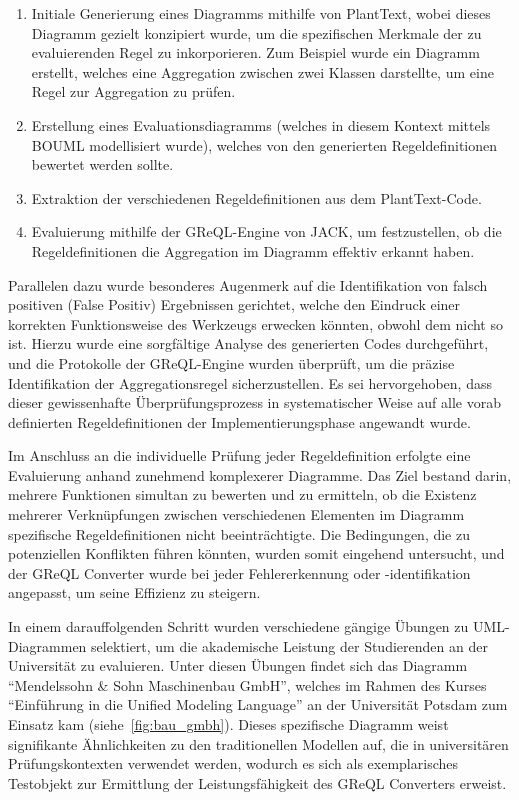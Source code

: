 \begin{enumerate}
    \item Initiale Generierung eines Diagramms mithilfe von PlantText, wobei dieses Diagramm gezielt konzipiert wurde,
um die spezifischen Merkmale der zu evaluierenden Regel zu inkorporieren. Zum Beispiel wurde ein Diagramm erstellt,
welches eine Aggregation zwischen zwei Klassen darstellte, um eine Regel zur Aggregation zu prüfen.
    \item Erstellung eines Evaluationsdiagramms (welches in diesem Kontext mittels BOUML modellisiert wurde), welches von
den generierten Regeldefinitionen bewertet werden sollte.
    \item Extraktion der verschiedenen Regeldefinitionen aus dem PlantText-Code.
    \item Evaluierung mithilfe der GReQL-Engine von JACK, um festzustellen, ob die Regeldefinitionen die Aggregation
im Diagramm effektiv erkannt haben.
\end{enumerate}

Parallelen dazu wurde besonderes Augenmerk auf die Identifikation von falsch positiven (False Positiv) Ergebnissen
gerichtet, welche den Eindruck einer korrekten Funktionsweise des Werkzeugs erwecken könnten, obwohl dem nicht so ist.
Hierzu wurde eine sorgfältige Analyse des generierten Codes durchgeführt, und die Protokolle der GReQL-Engine wurden
überprüft, um die präzise Identifikation der Aggregationsregel sicherzustellen. Es sei hervorgehoben, dass dieser
gewissenhafte Überprüfungsprozess in systematischer Weise auf alle vorab definierten Regeldefinitionen der
Implementierungsphase angewandt wurde.

Im Anschluss an die individuelle Prüfung jeder Regeldefinition erfolgte eine Evaluierung anhand zunehmend komplexerer
Diagramme. Das Ziel bestand darin, mehrere Funktionen simultan zu bewerten und zu ermitteln, ob die Existenz mehrerer
Verknüpfungen zwischen verschiedenen Elementen im Diagramm spezifische Regeldefinitionen nicht beeinträchtigte. Die
Bedingungen, die zu potenziellen Konflikten führen könnten, wurden somit eingehend untersucht, und der GReQL Converter
wurde bei jeder Fehlererkennung oder -identifikation angepasst, um seine Effizienz zu steigern.

In einem darauffolgenden Schritt wurden verschiedene gängige Übungen zu UML-Diagrammen selektiert, um die akademische
Leistung der Studierenden an der Universität zu evaluieren. Unter diesen Übungen findet sich das Diagramm ``Mendelssohn
\& Sohn Maschinenbau GmbH'', welches im Rahmen des Kurses ``Einführung in die Unified Modeling Language'' an der
Universität Potsdam zum Einsatz kam (siehe~\ref{fig:bau_gmbh}). Dieses spezifische Diagramm weist signifikante
Ähnlichkeiten zu den traditionellen Modellen auf, die in universitären Prüfungskontexten verwendet werden, wodurch es
sich als exemplarisches Testobjekt zur Ermittlung der Leistungsfähigkeit des GReQL Converters erweist.

